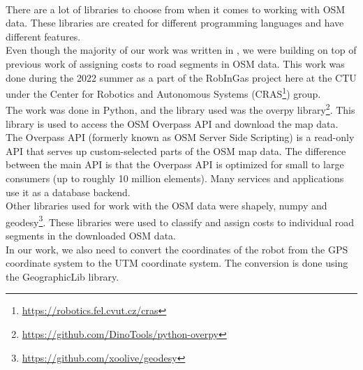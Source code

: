     \\
        There are a lot of libraries to choose from when it comes to working with OSM data. These libraries are created for different programming languages and have different features.\\
        Even though the majority of our work was written in \CC, we were building on top of previous work of assigning costs to road segments in OSM data. This work was done during the 2022 summer as a part of the RobInGas project here at the CTU under the Center for Robotics and Autonomous Systems (CRAS\footnote{\url{https://robotics.fel.cvut.cz/cras}}) group.\\
        The work was done in Python, and the library used was the overpy library\footnote{\url{https://github.com/DinoTools/python-overpy}}. This library is used to access the OSM Overpass API and download the map data. The Overpass API (formerly known as OSM Server Side Scripting) is a read-only API that serves up custom-selected parts of the OSM map data. The difference between the main API is that the Overpass API is optimized for small to large consumers (up to roughly 10 million elements). Many services and applications use it as a database backend.\cite{Overpass}\\
        Other libraries used for work with the OSM data were shapely\cite{shapely}, numpy\cite{numpy} and geodesy\footnote{\url{https://github.com/xoolive/geodesy}}. These libraries were used to classify and assign costs to individual road segments in the downloaded OSM data.\\
        In our work, we also need to convert the coordinates of the robot from the GPS coordinate system to the UTM coordinate system. The conversion is done using the GeographicLib library\cite{GeographicLib}.